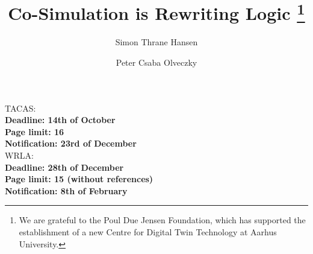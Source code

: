 \documentclass[runningheads]{llncs}
\begin{document}
\title{Co-Simulation is Rewriting Logic
\thanks{We are grateful to the Poul Due Jensen Foundation, which has supported the establishment of a new Centre for Digital Twin Technology at Aarhus University.}}

\author{Simon Thrane Hansen  
\and Peter Csaba Olveczky  }
%


%
\institute{
  DIGIT, Department of Electrical and Computer Engineering, Aarhus University, \\
  \and Department of Computer Science, Oslo University - \textbf{Check this} \\
}

\maketitle              %
TACAS:\\
\textbf{Deadline: 14th of October}
\\
\textbf{Page limit: 16}\\
\textbf{Notification: 23rd of December}
\\
WRLA:\\
\textbf{Deadline: 28th of December}
\\
\textbf{Page limit: 15 (without references)}\\
\textbf{Notification: 8th of February}
\end{document}
